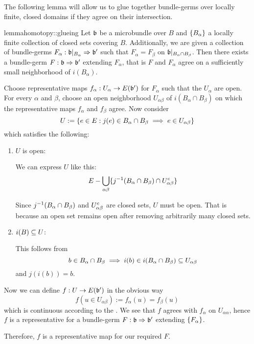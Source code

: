 \begin{myparagraph}
    The following lemma will allow us to glue
    together bundle-germs over locally finite, closed domains if they agree on their intersection.
\end{myparagraph}

\begin{mystatement}{lemma}{homotopy::glueing}
    Let $\bb$ be a microbundle over $B$ and $\{B_\alpha\}$ a locally finite collection of closed sets covering $B$.
    Additionally, we are given a collection of bundle-germs $\germdef{F_\alpha}{\bb[B_\alpha]}{\bb'}$
    such that $F_\alpha = F_\beta$ on $\bb[B_\alpha \cap B_\beta]$.
    Then there exists a bundle-germ $\germdef{F}{\bb}{\bb'}$ extending $F_\alpha$,
    that is $F$ and $F_\alpha$ agree on a sufficiently small neighborhood of $i(B_\alpha)$.
\end{mystatement}

\begin{myproof}
    Choose representative maps $f_\alpha: U_\alpha \to E(\bb')$ for $F_\alpha$ such that the $U_\alpha$ are open.
    For every $\alpha$ and $\beta$, choose an open neighborhood $U_{\alpha\beta}$ of $i(B_\alpha \cap B_\beta)$ on which the representative maps $f_\alpha$ and $f_\beta$ agree.
    Now consider
    \[ U := \{ e \in E:j(e) \in B_\alpha \cap B_\beta \implies e \in U_{\alpha\beta}\} \]
    which satisfies the following:
    \begin{enumerate}
        \item $U$ is open:

        We can express $U$ like this:
        \[ E - \bigcup_{\alpha\beta} \{ j^{-1}(B_\alpha \cap B_\beta) \cap U_{\alpha\beta}^c \} \]
        
        Since $j^{-1}(B_\alpha \cap B_\beta)$ and $U_{\alpha\beta}^c$ are closed sets, $U$ must be open.
        That is because an open set remains open after removing arbitrarily many closed sets.
        \item $i(B) \subseteq{} U$:
        
        This follows from
        \[ b \in B_\alpha \cap B_\beta \implies i(b) \in i(B_\alpha \cap B_\beta) \subseteq{} U_{\alpha\beta} \]
        and $j(i(b)) = b$.
    \end{enumerate}
    Now we can define $f: U \to E(\bb')$ in the obvious way
    \[ f(u \in U_{\alpha\beta}) := f_\alpha(u) = f_\beta(u) \]
    which is continuous according to the .
    We see that $f$ agrees with $f_\alpha$ on $U_{\alpha\alpha}$,
    hence $f$ is a representative for a bundle-germ $\germdef{F}{\bb}{\bb'}$ extending $\{F_\alpha\}$.
    
    Therefore, $f$ is a representative map for our required $F$.
\end{myproof}